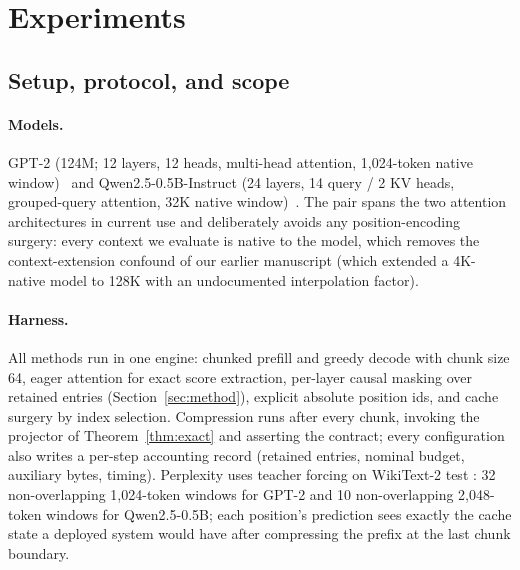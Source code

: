 \section{Experiments}\label{sec:exp}

\subsection{Setup, protocol, and scope}\label{sec:exp-setup}

\paragraph{Models.}
GPT-2 (124M; 12 layers, 12 heads, multi-head attention, 1{,}024-token
native window)~\cite{radford2019gpt2} and
Qwen2.5-0.5B-Instruct (24 layers, 14 query / 2 KV heads, grouped-query
attention, 32K native window)~\cite{qwen2025}. The pair spans the two
attention architectures in current use and deliberately avoids any
position-encoding surgery: every context we evaluate is native to the
model, which removes the context-extension confound of our earlier
manuscript (which extended a 4K-native model to 128K with an undocumented
interpolation factor).

\paragraph{Harness.}
All methods run in one engine: chunked prefill and greedy decode with
chunk size 64, eager attention for exact score extraction, per-layer
causal masking over retained entries (Section~\ref{sec:method}), explicit
absolute position ids, and cache surgery by index selection. Compression
runs after every chunk, invoking the projector of
Theorem~\ref{thm:exact} and asserting the contract; every configuration
also writes a per-step accounting record (retained entries, nominal
budget, auxiliary bytes, timing). Perplexity uses teacher forcing on
WikiText-2 test \cite{merity2016wikitext}: 32 non-overlapping
1{,}024-token windows for GPT-2 and 10 non-overlapping 2{,}048-token
windows for Qwen2.5-0.5B; each position's prediction sees exactly the
cache state a deployed system would have after compressing the prefix at
the last chunk boundary.

